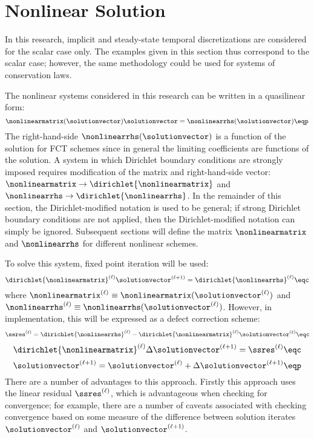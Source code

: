 \section{Nonlinear Solution}
In this research, implicit and steady-state temporal discretizations are
considered for the scalar case only. The examples given in this section thus
correspond to the scalar case; however, the same methodology could be used
for systems of conservation laws.

The nonlinear systems considered in this research can be written in a quasilinear
form:
\begin{equation}\label{eq:nonlinear_equation}
  \nonlinearmatrix(\solutionvector)\solutionvector
    = \nonlinearrhs(\solutionvector) \eqp
\end{equation}
The right-hand-side $\nonlinearrhs(\solutionvector)$ is a function of
the solution for FCT schemes since in general the limiting coefficients are
functions of the solution.
A system in which Dirichlet boundary conditions are strongly imposed
requires modification of the matrix and right-hand-side vector:
$\nonlinearmatrix\rightarrow\dirichlet{\nonlinearmatrix}$ and
$\nonlinearrhs\rightarrow\dirichlet{\nonlinearrhs}$. In the remainder of
this section, the Dirichlet-modified notation is used to be general;
if strong Dirichlet boundary conditions are not applied, then the
Dirichlet-modified notation can simply be ignored. Subsequent sections
will define the matrix $\nonlinearmatrix$ and $\nonlinearrhs$ for different
nonlinear schemes.

To solve this system, fixed point iteration will be used:
\begin{equation}
  \dirichlet{\nonlinearmatrix}^{(\ell)}\solutionvector^{(\ell+1)}
    = \dirichlet{\nonlinearrhs}^{(\ell)} \eqc
\end{equation}
where $\nonlinearmatrix^{(\ell)}\equiv\nonlinearmatrix(\solutionvector^{(\ell)})$
and $\nonlinearrhs^{(\ell)}\equiv\nonlinearrhs(\solutionvector^{(\ell)})$.
However, in implementation, this will be expressed as a defect correction scheme:
\begin{equation}
  \ssres^{(\ell)} = \dirichlet{\nonlinearrhs}^{(\ell)}
    - \dirichlet{\nonlinearmatrix}^{(\ell)}\solutionvector^{(\ell)} \eqc
\end{equation}
\begin{equation}
  \dirichlet{\nonlinearmatrix}^{(\ell)}\Delta\solutionvector^{(\ell+1)}
    = \ssres^{(\ell)} \eqc
\end{equation}
\begin{equation}
  \solutionvector^{(\ell+1)} = \solutionvector^{(\ell)}
    + \Delta\solutionvector^{(\ell+1)} \eqp
\end{equation}
There are a number of advantages to this approach. Firstly this approach uses
the linear residual $\ssres^{(\ell)}$, which is advantageous when checking
for convergence; for example, there are a number of caveats associated with
checking convergence based on some measure of the difference between solution
iterates $\solutionvector^{(\ell)}$ and $\solutionvector^{(\ell+1)}$.

